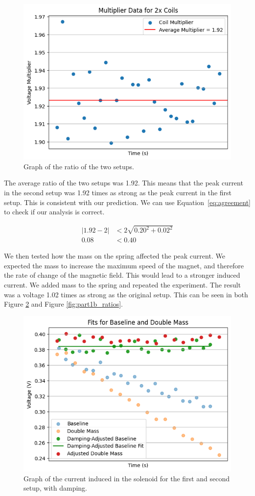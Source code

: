 \documentclass[11pt]{article}
\begin{document}
    \begin{figure}[H]
        \centering
        \includegraphics[width=0.8\linewidth]{resources/images/part1a ratios}
        \caption{Graph of the ratio of the two setups.}
        \label{fig:part1a_ratios}
    \end{figure}

    The average ratio of the two setups was 1.92.
    This means that the peak current in the second setup was 1.92 times as strong as the peak current in the first setup.
    This is consistent with our prediction.
    We can use Equation~\ref{eq:agreement} to check if our analysis is correct.

    \begin{align*}
        |1.92 - 2| &< 2 \sqrt{0.20^2 + 0.02^2} \\
        0.08 &< 0.40
    \end{align*}

    We then tested how the mass on the spring affected the peak current.
    We expected the mass to increase the maximum speed of the magnet, and therefore the rate of change of the magnetic field.
    This would lead to a stronger induced current.
    We added mass to the spring and repeated the experiment.
    The result was a voltage 1.02 times as strong as the original setup.
    This can be seen in both Figure \ref{fig:part1b_damping} and Figure \ref{fig:part1b_ratios}.

    \begin{figure}[H]
        \centering
        \includegraphics[width=0.8\linewidth]{resources/images/part1b damping}
        \caption{Graph of the current induced in the solenoid for the first and second setup, with damping.}
        \label{fig:part1b_damping}
    \end{figure}
\end{document}
